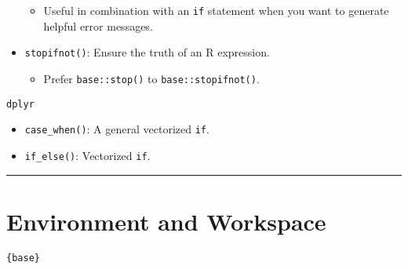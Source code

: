 \documentclass[]{book}
\providecommand{\tightlist}{%
  \setlength{\itemsep}{0pt}\setlength{\parskip}{0pt}}
\begin{document}
\begin{itemize}
  \begin{itemize}
  \tightlist
  \item
    Useful in combination with an \texttt{if} statement when you want to generate helpful error messages.
  \end{itemize}
\item
  \texttt{stopifnot()}: Ensure the truth of an R expression.

  \begin{itemize}
  \tightlist
  \item
    Prefer \texttt{base::stop()} to \texttt{base::stopifnot()}.
  \end{itemize}
\end{itemize}

\texttt{dplyr}

\begin{itemize}
\tightlist
\item
  \texttt{case\_when()}: A general vectorized \texttt{if}.
\item
  \texttt{if\_else()}: Vectorized \texttt{if}.
\end{itemize}

\begin{center}\rule{0.5\linewidth}{\linethickness}\end{center}

\hypertarget{environment-and-workspace}{%
\section{Environment and Workspace}\label{environment-and-workspace}}

\texttt{\{base\}}
\end{document}
